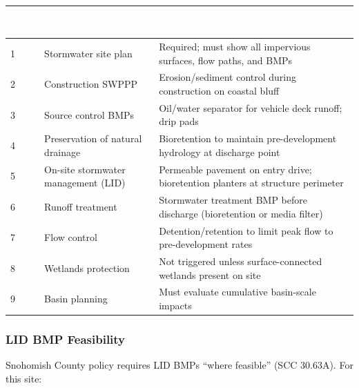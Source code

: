 \documentclass[11pt,letterpaper]{article}
\newcommand{\tableheader}[1]{\textbf{\sffamily\textcolor{white}{#1}}}
\begin{document}
\begin{center}
\begin{tabularx}{\textwidth}{L{1.5cm}L{4cm}X}
\toprule
{}
\tableheader{MR \#} & \tableheader{Requirement} & \tableheader{Application to This Project} \\
 & Stormwater site plan & Required; must show all impervious surfaces, flow paths, and BMPs \\
2 & Construction SWPPP & Erosion/sediment control during construction on coastal bluff \\
3 & Source control BMPs & Oil/water separator for vehicle deck runoff; drip pads \\
4 & Preservation of natural drainage & Bioretention to maintain pre-development hydrology at discharge point \\
5 & On-site stormwater management (LID) & Permeable pavement on entry drive; bioretention planters at structure perimeter \\
6 & Runoff treatment & Stormwater treatment BMP before discharge (bioretention or media filter) \\
7 & Flow control & Detention/retention to limit peak flow to pre-development rates \\
8 & Wetlands protection & Not triggered unless surface-connected wetlands present on site \\
9 & Basin planning & Must evaluate cumulative basin-scale impacts \\
\bottomrule
\end{tabularx}
\end{center}

\subsubsection{LID BMP Feasibility}

Snohomish County policy requires LID BMPs ``where feasible'' (SCC 30.63A). For this site:
\end{document}
